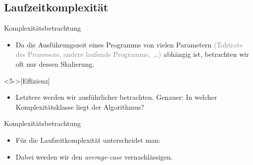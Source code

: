 \subsection{Laufzeitkomplexität}
\begin{frame}{Komplexitätsbetrachtung}
    \begin{itemize}[<+(1)->]
        \widei
        \item Da die Ausführungszeit eines Programms von vielen Parametern\pause{} \textcolor{gray}{(Taktrate des Prozessors, andere laufende Programme,~\ldots)} abhängig ist,\pause{} betrachten wir oft nur dessen Skalierung.
    \end{itemize}
    \begin{definition}<5->[Effizienz]
    \end{definition}
    \begin{itemize}
        \widei
        \item<7-> Letztere werden wir ausführlicher betrachten. Genauer: In welcher Komplexitätsklasse liegt der Algorithmus?
    \end{itemize}
\end{frame}

\begin{frame}{Komplexitätsbetrachtung}
    \begin{itemize}[<+(1)->]
        \widei
        \item Für die Laufzeitkomplexität unterscheidet man: 
        \item Dabei werden wir den \textit{average-case} vernachlässigen.
    \end{itemize}
\end{frame}

